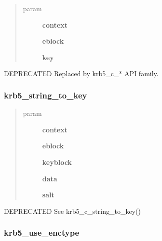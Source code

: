\documentclass[letterpaper,10pt,english]{sphinxmanual}
\begin{document}
\begin{quote}\begin{description}
\item[{param}] \leavevmode
\textbf{context}

\textbf{eblock}

\textbf{key}

\end{description}\end{quote}

DEPRECATED Replaced by krb5\_c\_* API family.


\subsubsection{krb5\_string\_to\_key}
\label{appdev/refs/api/krb5_string_to_key:krb5-string-to-key}\label{appdev/refs/api/krb5_string_to_key::doc}

\begin{fulllineitems}
\label{appdev/refs/api/krb5_string_to_key:krb5_string_to_key}
\end{fulllineitems}

\begin{quote}\begin{description}
\item[{param}] \leavevmode
\textbf{context}

\textbf{eblock}

\textbf{keyblock}

\textbf{data}

\textbf{salt}

\end{description}\end{quote}

DEPRECATED See krb5\_c\_string\_to\_key()


\subsubsection{krb5\_use\_enctype}
\label{appdev/refs/api/krb5_use_enctype:krb5-use-enctype}\label{appdev/refs/api/krb5_use_enctype::doc}
\end{document}
